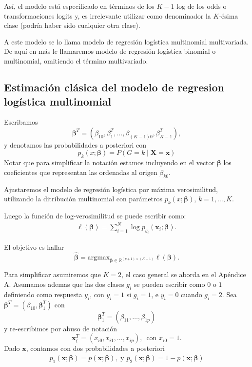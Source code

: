 \documentclass{report}
\begin{document}
 Así, el modelo está especificado en términos de los $K-1$ log de los odds o transformaciones logits  y, es irrelevante utilizar como denominador la $K$-ésima clase (podría haber sido cualquier otra clase). 

 A este modelo  se lo llama modelo de regresión logística multinomial multivariada.  De aquí en más le llamaremos modelo de regresión logística binomial o multinomial, omitiendo el término multivariado. 
 
 
\subsection{Estimación clásica del modelo de regresion logística multinomial}\label{estimamrlmulti}


 Escribamos $$ \boldsymbol{\beta}^T=\left(\beta_{10}, \beta_1^T, \ldots, \beta_{(K-1) 0}, \beta_{K-1}^T\right),$$ y denotamos las  probabilidades a posteriori con $$p_k(x ; \boldsymbol{\beta})=P(G=k \mid \mathbf{X}=\mathbf{x})$$
Notar que para simplificar la notación estamos incluyendo en el vector $\boldsymbol{\beta}$ los coeficientes que representan las ordenadas al origen $\beta_{k0}$. 

 Ajustaremos el modelo de regresión logística por máxima verosimilitud, utilizando la ditribución multinomial con parámetros  $p_k(x ; \boldsymbol{\beta})$, $k=1,\ldots, K$.
 

 Luego 
la función de log-verosimilitud se puede escribir como: 
\begin{eqnarray}\label{logvero}
\ell(\boldsymbol{\beta})=\sum_{i=1}^N \log p_{g_i}\left(\mathbf{x}_i ; \boldsymbol{\beta}\right).
\end{eqnarray}


 El objetivo es hallar
$$\widehat{\boldsymbol{\beta}}=\text{argmax}_{\boldsymbol{\beta} \in \mathbb{R}^{(p+1)\times (K-1)}} \ell(\boldsymbol{\beta}).$$

 Para simplificar asumiremos que $K=2$, el caso general se aborda en el Apéndice A. Asumamos ademas que las dos clases $g_i$ se pueden escribir como $0$ o $1$ definiendo como respuesta $y_i$, con $y_i=1$ si $g_i=1$, e $y_i=0$ cuando $g_i=2$.  Sea $\boldsymbol{\beta}^T=\left(\beta_{10}, \boldsymbol{\beta}_1^T\right)$ con  
$$\boldsymbol{\beta}_1^T=(\beta_{11}, \ldots, \beta_{1p})$$
y re-escribimos por abuso de notación $$\mathbf{x}_i^T=(x_{i0},x_{i1}, \ldots, x_{ip}),\, \text{ con } x_{i0}=1.$$  Dado $\mathbf{x}$, contamos con dos probabilidades a posteriori
\begin{eqnarray}\label{posteri}
p_1(\mathbf{x} ; \boldsymbol{\beta})=p(\mathbf{x} ; \boldsymbol{\beta}), \text{ y } p_2(\mathbf{x} ; \boldsymbol{\beta})=1-p(\mathbf{x} ; \boldsymbol{\beta})
\end{eqnarray}
\end{document}
